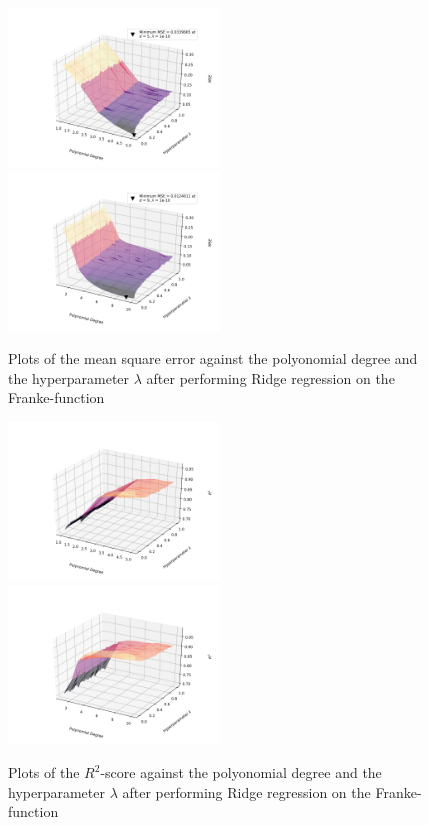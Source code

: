 \documentclass[a4paper,10pt,english]{article}
\begin{document}
\begin{figure}[H]
	\centering 
	\includegraphics[width = 0.5\textwidth, center]{../franke_output/part_D_2.png}
	\includegraphics[width = 0.5\textwidth, center]{../franke_output/part_D_2_highdeg.png}
	\caption{
		Plots of the mean square error against the polyonomial degree and the hyperparameter $\lambda$ after performing Ridge regression on the Franke-function 
	}
	\label{part_d2}
\end{figure}

\begin{figure}[H]
	\centering 
	\includegraphics[width = 0.5\textwidth, center]{../franke_output/part_D_3.png}
	\includegraphics[width = 0.5\textwidth, center]{../franke_output/part_D_3_highdeg.png}
	\caption{
		Plots of the $R^2$-score against the polyonomial degree and the hyperparameter $\lambda$ after performing Ridge regression on the Franke-function
	}
	\label{part_d3}
\end{figure}
\end{document}
